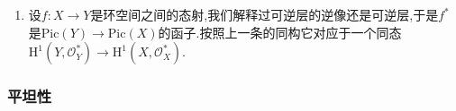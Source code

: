 \begin{enumerate}
\begin{proof}
		$\varphi$是单射:因为$\mathrm{H}^1(X,\mathscr{O}_X^*)=\varinjlim_{\mathfrak{U}}\check{\mathrm{H}}^1(\mathfrak{U},\mathscr{O}_X^*)$,于是归结为证明每个$\varphi_{\mathfrak{U}}$都是单射.而这归结于粘合的唯一性.
		
		\qquad
		
		最后验证$\varphi$是群同态:设$\mathscr{L}$和$\mathscr{L}'$是两个可逆$\mathscr{O}_X$模层.那么存在$X$的开覆盖$\mathfrak{U}=\{U_i\}$,使得$\mathscr{L}\mid_{U_i}$和$\mathscr{L}'\mid_{U_i}$都同构于$\mathscr{O}_X\mid_{U_i}$.如果$\mathscr{L}$和$\mathscr{L}'$对应的余圈分别是$\{\theta_{ij}\}$和$\{\theta_{ij}'\}$,那么$\{\theta_{ij}\theta_{ij}'\}$就对应于$\mathscr{L}\otimes_{\mathscr{O}_X}\mathscr{L}'$.
	\end{proof}
	\item 设$f:X\to Y$是环空间之间的态射,我们解释过可逆层的逆像还是可逆层,于是$f^*$是$\mathrm{Pic}(Y)\to\mathrm{Pic}(X)$的函子.按照上一条的同构它对应于一个同态$\mathrm{H}^1(Y,\mathscr{O}_Y^*)\to\mathrm{H}^1(X,\mathscr{O}_X^*)$.
\end{enumerate}
\subsubsection{平坦性}

